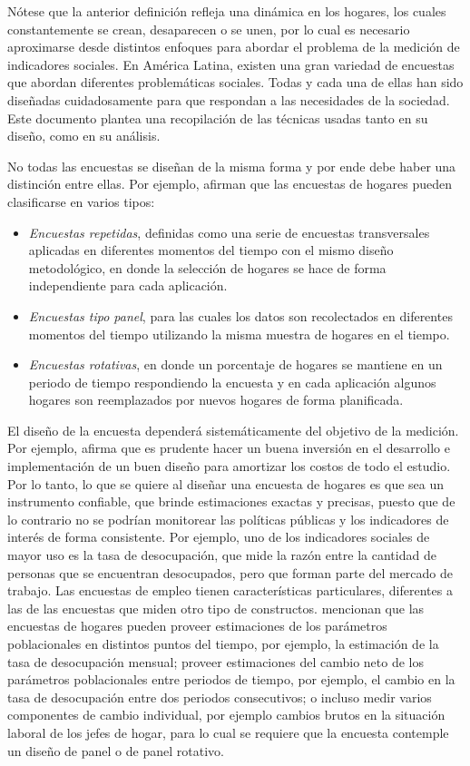 \documentclass[
  12pt,
]{book}
\providecommand{\tightlist}{%
  \setlength{\itemsep}{0pt}\setlength{\parskip}{0pt}}
\begin{document}
Nótese que la anterior definición refleja una dinámica en los hogares, los cuales constantemente se crean, desaparecen o se unen, por lo cual es necesario aproximarse desde distintos enfoques para abordar el problema de la medición de indicadores sociales. En América Latina, existen una gran variedad de encuestas que abordan diferentes problemáticas sociales. Todas y cada una de ellas han sido diseñadas cuidadosamente para que respondan a las necesidades de la sociedad. Este documento plantea una recopilación de las técnicas usadas tanto en su diseño, como en su análisis.

No todas las encuestas se diseñan de la misma forma y por ende debe haber una distinción entre ellas. Por ejemplo, \citet{Kalton_Citro_1993} afirman que las encuestas de hogares pueden clasificarse en varios tipos:

\begin{itemize}
\tightlist
\item
  \emph{Encuestas repetidas}, definidas como una serie de encuestas transversales aplicadas en diferentes momentos del tiempo con el mismo diseño metodológico, en donde la selección de hogares se hace de forma independiente para cada aplicación.
\item
  \emph{Encuestas tipo panel}, para las cuales los datos son recolectados en diferentes momentos del tiempo utilizando la misma muestra de hogares en el tiempo.
\item
  \emph{Encuestas rotativas}, en donde un porcentaje de hogares se mantiene en un periodo de tiempo respondiendo la encuesta y en cada aplicación algunos hogares son reemplazados por nuevos hogares de forma planificada.
\end{itemize}

El diseño de la encuesta dependerá sistemáticamente del objetivo de la medición. Por ejemplo, \citet{Kalton_2009} afirma que es prudente hacer un buena inversión en el desarrollo e implementación de un buen diseño para amortizar los costos de todo el estudio. Por lo tanto, lo que se quiere al diseñar una encuesta de hogares es que sea un instrumento confiable, que brinde estimaciones exactas y precisas, puesto que de lo contrario no se podrían monitorear las políticas públicas y los indicadores de interés de forma consistente. Por ejemplo, uno de los indicadores sociales de mayor uso es la tasa de desocupación, que mide la razón entre la cantidad de personas que se encuentran desocupados, pero que forman parte del mercado de trabajo. Las encuestas de empleo tienen características particulares, diferentes a las de las encuestas que miden otro tipo de constructos. \citet{Duncan_Kalton_1987} mencionan que las encuestas de hogares pueden proveer estimaciones de los parámetros poblacionales en distintos puntos del tiempo, por ejemplo, la estimación de la tasa de desocupación mensual; proveer estimaciones del cambio neto de los parámetros poblacionales entre periodos de tiempo, por ejemplo, el cambio en la tasa de desocupación entre dos periodos consecutivos; o incluso medir varios componentes de cambio individual, por ejemplo cambios brutos en la situación laboral de los jefes de hogar, para lo cual se requiere que la encuesta contemple un diseño de panel o de panel rotativo.
\end{document}
